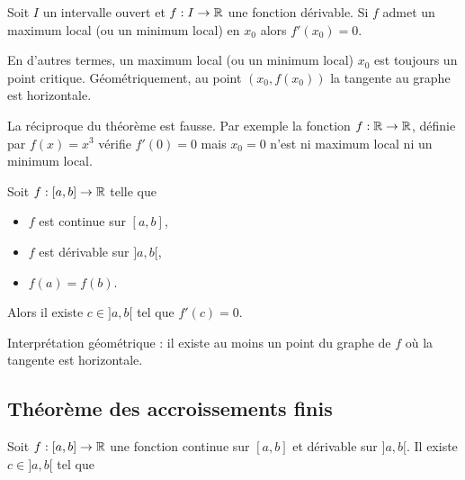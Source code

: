 \documentclass[10pt,class=article,crop=false]{standalone}
\begin{document}
\begin{multicols}{2}


\begin{theoreme}
	\label{th:extremum}
	Soit $I$ un intervalle ouvert et $f : I \to \mathbb{R}$ une fonction
	dérivable. Si $f$ admet un maximum local (ou un minimum local)
	en $x_0$ alors $f'(x_0)=0$.
\end{theoreme}

En d'autres termes, un maximum local (ou un minimum local) $x_0$ est toujours un point critique.
Géométriquement, au point $(x_0,f(x_0))$ la tangente au graphe est horizontale.


La réciproque du théorème est fausse.
Par exemple la fonction $f : \mathbb{R} \to \mathbb{R}$, définie par $f(x)= x^3$
vérifie $f'(0)=0$ mais $x_0=0$ n'est ni maximum local ni un minimum local.




\begin{theoreme}
	\label{th:rolle}
	Soit $f:[a,b] \to \mathbb{R}$ telle que
	\begin{itemize}
		\item $f$ est continue sur $[a,b]$,
		\item $f$ est dérivable sur $]a,b[$,
		\item $f(a)=f(b)$.
	\end{itemize}
	Alors il existe $c \in {}]a,b[$  tel que $f'(c)=0$.
\end{theoreme}
%

Interprétation géométrique : il existe au moins un point du graphe de $f$ où la tangente est horizontale.


\subsection{Théorème des accroissements finis}


\begin{theoreme}
	Soit $f:[a,b] \to \mathbb{R}$ une fonction continue sur $[a,b]$ et dérivable sur $]a,b[$.
	Il existe $c\in{}]a,b[$ tel que
\end{theoreme}


\end{multicols}
\end{document}
